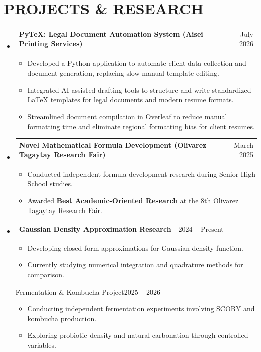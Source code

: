 \documentclass[letterpaper,11pt]{article}
\makeatletter
\newcommand{\resumeItem}[1]{
  \item \small{#1}
}
\newcommand{\resumeProjectHeading}[2]{
\item
\begin{tabular*}{\textwidth}{l@{\extracolsep{\fill}}r}
\textbf{#1} & {\small #2} \\
\end{tabular*}
}
\makeatother
\begin{document}
\section{PROJECTS \& RESEARCH}
\begin{itemize}[leftmargin=0in, label={}]

\resumeProjectHeading{PyTeX: Legal Document Automation System (Aisei Printing Services)}{July 2026}
\begin{itemize}
    \resumeItem{Developed a Python application to automate client data collection and document generation, replacing slow manual template editing.}
\resumeItem{Integrated AI-assisted drafting tools to structure and write standardized LaTeX templates for legal documents and modern resume formats.}
\resumeItem{Streamlined document compilation in Overleaf to reduce manual formatting time and eliminate regional formatting bias for client resumes.}
\end{itemize}


\resumeProjectHeading
{Novel Mathematical Formula Development (Olivarez Tagaytay Research Fair)}{March 2025}
\begin{itemize}
\resumeItem{Conducted independent formula development research during Senior High School studies.}
\resumeItem{Awarded \textbf{Best Academic-Oriented Research} at the 8th Olivarez Tagaytay Research Fair.}
\end{itemize}

\resumeProjectHeading
{Gaussian Density Approximation Research}{2024 -- Present}
\begin{itemize}
\resumeItem{Developing closed-form approximations for Gaussian density function.}
\resumeItem{Currently studying numerical integration and quadrature methods for comparison.}
\end{itemize}




{Fermentation \& Kombucha Project}{2025 -- 2026}
\begin{itemize}
\resumeItem{Conducting independent fermentation experiments involving SCOBY and kombucha production.}
\resumeItem{Exploring probiotic density and natural carbonation through controlled variables.}
\end{itemize}

\end{itemize}
\vspace{-5pt}
\end{document}
